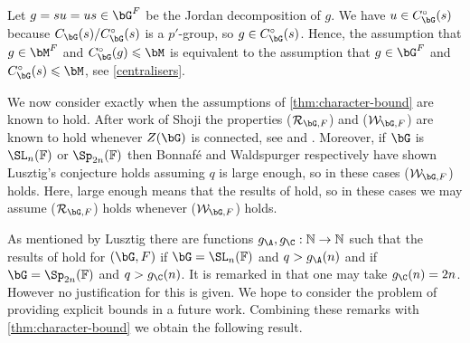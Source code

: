 \documentclass[eqthmnum,nocolour,skinny]{jt-calcs}
\begin{document}
\begin{rem}
Let $g = su = us \in \bG^F$ be the Jordan decomposition of $g$. We have $u \in C_{\bG}^{\circ}(s)$ because $C_{\bG}(s)/C_{\bG}^{\circ}(s)$ is a $p'$-group, so $g \in C_{\bG}^{\circ}(s)$. Hence, the assumption that $g \in \bM^F$ and $C_{\bG}^{\circ}(g) \leqslant \bM$ is equivalent to the assumption that $g \in \bG^F$ and $C_{\bG}^{\circ}(s) \leqslant \bM$, see \cref{centralisers}.
\end{rem}

\begin{pa}
We now consider exactly when the assumptions of \cref{thm:character-bound} are known to hold. After work of Shoji the properties ($\mathcal{R}_{\bG,F}$) and ($\mathcal{W}_{\bG,F}$) are known to hold whenever $Z(\bG)$ is connected, see \cite{shoji:1995:character-sheaves-and-almost-characters} and \cite[Thm.~4.2]{shoji:1996:on-the-computation}. Moreover, if $\bG$ is $\SL_n(\mathbb{F})$ or $\Sp_{2n}(\mathbb{F})$ then Bonnaf\'e \cite{bonnafe:2006:sln} and Waldspurger \cite{waldspurger:2004:lusztigs-conjecture} respectively have shown Lusztig's conjecture holds assuming $q$ is large enough, so in these cases ($\mathcal{W}_{\bG,F}$) holds. Here, large enough means that the results of \cite{lusztig:1990:green-functions-and-character-sheaves} hold, so in these cases we may assume ($\mathcal{R}_{\bG,F}$) holds whenever ($\mathcal{W}_{\bG,F}$) holds.
\end{pa}


\begin{pa}\label{types A/C}
As mentioned by Lusztig \cite{lusztig:1990:green-functions-and-character-sheaves} there are functions $g_{\A},g_{\C} : \mathbb{N} \to \mathbb{N}$ such that the results of \cite{lusztig:1990:green-functions-and-character-sheaves} hold for $(\bG,F)$ if $\bG = \SL_n(\mathbb{F})$ and $q > g_{\A}(n)$ and if $\bG = \Sp_{2n}(\mathbb{F})$ and $q > g_{\C}(n)$. It is remarked in \cite[3.2]{waldspurger:2004:lusztigs-conjecture} that one may take $g_{\C}(n) = 2n$. However no justification for this is given. We hope to consider the problem of providing explicit bounds in a future work. Combining these remarks with \cref{thm:character-bound} we obtain the following result.
\end{pa}
\end{document}
